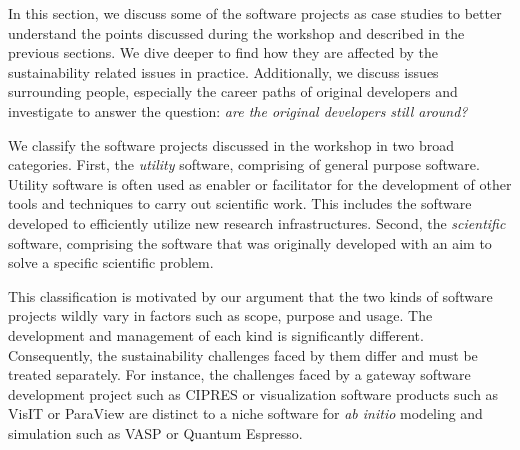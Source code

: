 \documentclass[11pt, oneside]{amsart}
\newcommand{\note}[1]{ {\textcolor{red}    { #1 }}}
\newcommand{\toolname}[1] {\textsf{#1}}
\begin{document}




In this section, we discuss some of the software projects as case
studies to better understand the points discussed during the workshop
and described in the previous sections. We dive deeper to find how 
they are affected by the sustainability related issues in
practice. Additionally, we discuss issues surrounding people,
especially the career paths of original developers and investigate to
answer the question: \emph{are the original developers still around?}

We classify the software projects discussed in the workshop in two
broad categories. First, the \emph{utility} software, comprising of
general purpose software. Utility software is often used as enabler
or facilitator for the development of other tools and techniques
to carry out scientific work. This includes the software developed to
efficiently utilize new research infrastructures. Second, the
\emph{scientific} software, comprising the software that was
originally developed with an aim to solve a specific scientific
problem.

This classification is motivated by our argument that the two kinds of
software projects wildly vary in factors such as scope, purpose and
usage. The development and management of each kind is significantly
different. Consequently, the sustainability challenges faced by them
differ and must be treated separately. For instance, the challenges
faced by a gateway software development project such as
\toolname{CIPRES} or visualization software products such as
\toolname{VisIT} or \toolname{ParaView} are distinct to a niche software for
\textit{ab initio} modeling and simulation such as \toolname{VASP} or
\toolname{Quantum Espresso}. %
\end{document}
